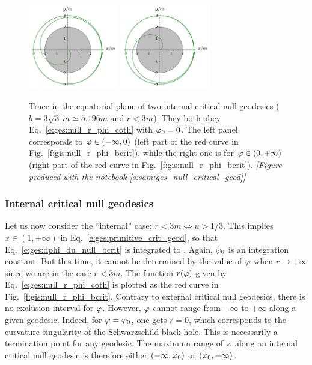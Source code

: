\begin{figure}
\centerline{
\includegraphics[width=0.35\textwidth]{ges_null_b_crit_intern_1.pdf}\qquad
\includegraphics[width=0.35\textwidth]{ges_null_b_crit_intern_2.pdf}
}
\caption[]{\label{f:gis:null_b_crit_intern} \footnotesize
Trace in the equatorial plane of two internal critical null geodesics ($b = 3\sqrt{3} \, m \simeq 5.196 m$ and
$r<3m$). They both obey Eq.~\eqref{e:ges:null_r_phi_coth} with $\varphi_0 = 0$.
The left panel corresponds to $\varphi\in (-\infty, 0)$ (left part of the red curve
in Fig.~\ref{f:gis:null_r_phi_bcrit}), while the right one is
for $\varphi\in (0, +\infty)$ (right part of the red curve
in Fig.~\ref{f:gis:null_r_phi_bcrit}).
\textsl{[Figure produced with the notebook \ref{s:sam:ges_null_critical_geod}]}
}
\end{figure}


\subsubsection{Internal critical null geodesics}

Let us now consider the ``internal'' case: $r< 3m \iff u>1/3$.
This implies $x\in (1,+\infty)$ in Eq.~\eqref{e:ges:primitive_crit_geod},
so that Eq.~\eqref{e:ges:dphi_du_null_bcrit} is integrated to
\be \label{e:ges:null_r_phi_coth}
    .
\ee
Again, $\varphi_0$ is an integration constant. But this time, it cannot be determined by the
value of $\varphi$ when $r\to +\infty$ since we are in the case $r<3m$.
The function $r(\varphi)$ given by Eq.~\eqref{e:ges:null_r_phi_coth} is plotted as the red
curve in Fig.~\ref{f:gis:null_r_phi_bcrit}. Contrary to external critical null geodesics, there
is no exclusion interval for $\varphi$. However, $\varphi$ cannot range from $-\infty$
to $+\infty$ along a given geodesic. Indeed, for $\varphi=\varphi_0$, one gets
$r=0$, which corresponds to the curvature singularity of the Schwarzschild black hole.
This is necessarily a termination point for any geodesic. The maximum
range of $\varphi$ along an internal critical null geodesic is therefore
either $(-\infty,\varphi_0)$ or $(\varphi_0,+\infty)$.

